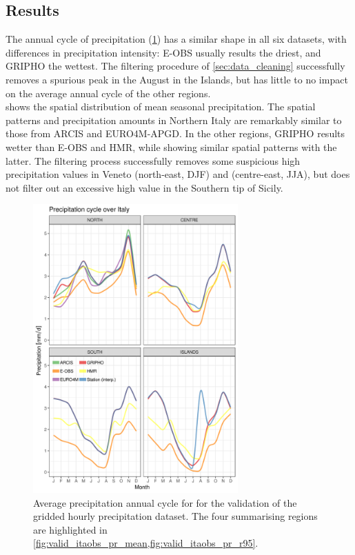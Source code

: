 \subsection{Results}
The annual cycle of precipitation (\cref{fig:valid_itaobs_pr_ac}) has a similar shape in all six datasets, with differences in precipitation intensity: E-OBS usually results the driest, and GRIPHO the wettest.
The filtering procedure of \cref{sec:data_cleaning} successfully removes a spurious peak in the August in the Islands, but has little to no impact on the average annual cycle of the other regions.\\
 shows the spatial distribution of mean seasonal precipitation.
The spatial patterns and precipitation amounts in Northern Italy are remarkably similar to those from ARCIS and EURO4M-APGD.
In the other regions, GRIPHO results wetter than E-OBS and HMR, while showing similar spatial patterns with the latter.
The filtering process successfully removes some suspicious high precipitation values in Veneto (north-east, DJF) and  (centre-east, JJA), but does not filter out an excessive high value in the Southern tip of Sicily.
\begin{figure}
    \centering
        \includegraphics[width=0.7\textwidth]{figures/valid_itaobs/ac}
    \decoRule
    \caption[GRIPHO validation: annual cycle]{
        Average precipitation annual cycle for for the validation of the gridded hourly precipitation dataset. The four summarising regions are highlighted in \cref{fig:valid_itaobs_pr_mean,fig:valid_itaobs_pr_r95}.
} \label{fig:valid_itaobs_pr_ac}
\end{figure}
